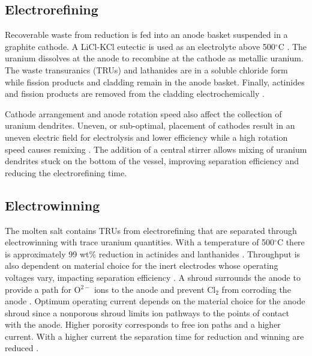 \documentclass{anstrans}
\begin{document}
\subsection{Electrorefining}

Recoverable waste from reduction is fed into an anode basket suspended in a graphite cathode. A LiCl-KCl eutectic is used as 
an electrolyte above 500$^{\circ}$C \cite{flowsheet_1998,lee_korean_2011}. The uranium dissolves at the anode to recombine at 
the cathode as metallic uranium. The waste transuranics (TRUs) and lathanides are in a soluble chloride form  while fission 
products and cladding remain in the anode basket. Finally, actinides and fission products are removed from the cladding 
electrochemically \cite{lee_korean_2011}.

Cathode arrangement and anode rotation speed also affect the collection of uranium dendrites. Uneven, or sub-optimal, 
placement of cathodes result in an uneven electric field for electrolysis and lower efficiency while a high rotation 
speed causes remixing \cite{lee_advanced_2008}. The addition of a central stirrer allows mixing of uranium dendrites 
stuck on the bottom of the vessel, improving separation efficiency and reducing the electrorefining time. 

\subsection{Electrowinning}

The molten salt contains TRUs from electrorefining that are separated through electrowinning with trace uranium quantities. 
With a temperature of 500$^{\circ}$C there is approximately 99 wt\% reduction in actinides and lanthanides \cite{flowsheet_1998}. 
Throughput is also dependent on material choice for the inert electrodes whose operating voltages vary, impacting separation 
efficiency \cite{koyama_development_2012}. A shroud surrounds the anode to provide a path for O$^{2-}$ ions to the anode and 
prevent Cl$_2$ from corroding the anode \cite{kim_development_2013,choi_electrochemical_2015}. Optimum operating current 
depends on the material choice for the anode shroud since a nonporous shroud limits ion pathways to the points of contact 
with the anode. Higher porosity corresponds to free ion paths and a higher current. With a higher current the separation 
time for reduction and winning are reduced \cite{choi_electrochemical_2015}.
\end{document}

